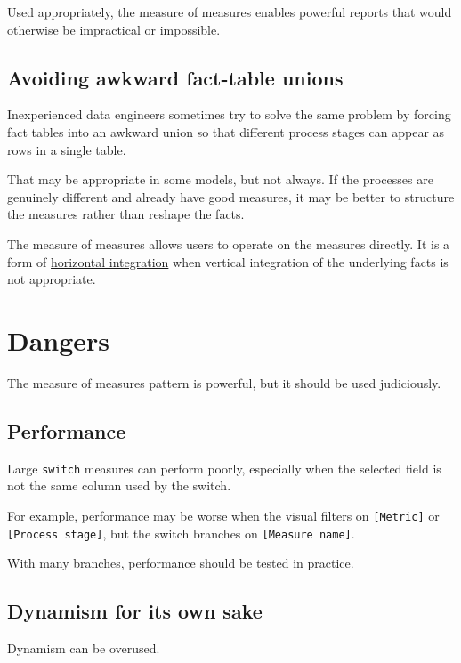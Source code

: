 \documentclass[10pt,openany,10pt]{book}
\begin{document}
Used appropriately, the measure of measures enables powerful reports
that would otherwise be impractical or impossible.

\subsection{Avoiding awkward fact-table
unions}\label{avoiding-awkward-fact-table-unions}

Inexperienced data engineers sometimes try to solve the same problem by
forcing fact tables into an awkward union so that different process
stages can appear as rows in a single table.

That may be appropriate in some models, but not always. If the processes
are genuinely different and already have good measures, it may be better
to structure the measures rather than reshape the facts.

The measure of measures allows users to operate on the measures
directly. It is a form of
\hyperref[docs-creating-information-conforming-systems]{horizontal
integration} when vertical integration of the underlying facts is not
appropriate.

\section{Dangers}\label{dangers}

The measure of measures pattern is powerful, but it should be used
judiciously.

\subsection{Performance}\label{performance}

Large \texttt{switch} measures can perform poorly, especially when the
selected field is not the same column used by the switch.

For example, performance may be worse when the visual filters on
\texttt{{[}Metric{]}} or \texttt{{[}Process\ stage{]}}, but the switch
branches on \texttt{{[}Measure\ name{]}}.

With many branches, performance should be tested in practice.

\subsection{Dynamism for its own sake}\label{dynamism-for-its-own-sake}

Dynamism can be overused.
\end{document}
